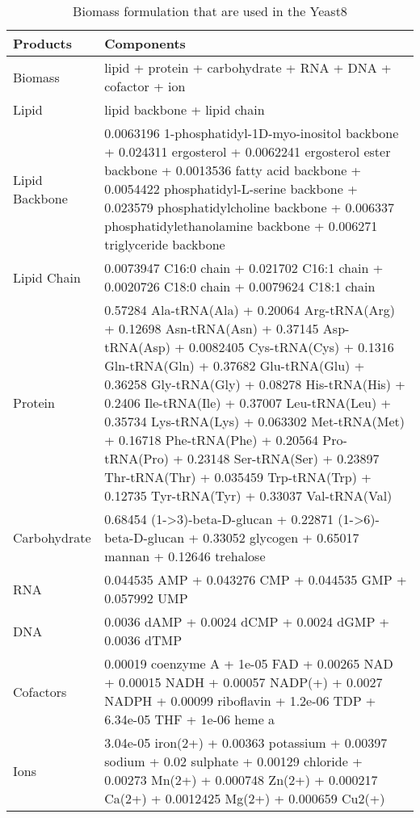 \begin{table}[H]
\small
\caption[Biomass coefficients]{Biomass formulation that are used in the Yeast8}
\begin{center}
  \begin{tabular}{|p{3cm}|p{11.5cm}|}
  \hline
  \textbf{Products} & \textbf{Components} \\ \hline
  Biomass      & lipid + protein + carbohydrate + RNA + DNA + cofactor + ion \\ \hline
    Lipid   & lipid backbone + lipid chain \\ \hline
  Lipid Backbone  & 0.0063196 1-phosphatidyl-1D-myo-inositol backbone +
  0.024311 ergosterol + 0.0062241 ergosterol ester backbone  +
  0.0013536 fatty acid backbone +
  0.0054422 phosphatidyl-L-serine backbone +
  0.023579 phosphatidylcholine backbone  +
  0.006337 phosphatidylethanolamine backbone +
  0.006271 triglyceride backbone \\ \hline
  Lipid Chain  & 0.0073947 C16:0 chain +
  0.021702 C16:1 chain +
  0.0020726 C18:0 chain +
  0.0079624 C18:1 chain \\ \hline
  Protein      & 0.57284 Ala-tRNA(Ala) +
  0.20064 Arg-tRNA(Arg) +
  0.12698 Asn-tRNA(Asn) +
  0.37145 Asp-tRNA(Asp) +
  0.0082405 Cys-tRNA(Cys) +
  0.1316 Gln-tRNA(Gln) +
  0.37682 Glu-tRNA(Glu) +
  0.36258 Gly-tRNA(Gly) +
  0.08278 His-tRNA(His) +
  0.2406 Ile-tRNA(Ile) +
  0.37007 Leu-tRNA(Leu) +
  0.35734 Lys-tRNA(Lys) +
  0.063302 Met-tRNA(Met) +
  0.16718 Phe-tRNA(Phe) +
  0.20564 Pro-tRNA(Pro) +
  0.23148 Ser-tRNA(Ser) +
  0.23897 Thr-tRNA(Thr) +
  0.035459 Trp-tRNA(Trp) +
  0.12735 Tyr-tRNA(Tyr) +
  0.33037 Val-tRNA(Val) \\ \hline
  Carbohydrate   & 0.68454 (1->3)-beta-D-glucan +
  0.22871 (1->6)-beta-D-glucan +
  0.33052 glycogen +
  0.65017 mannan +
  0.12646 trehalose \\ \hline
  RNA   & 0.044535 AMP +
  0.043276 CMP +
  0.044535 GMP +
  0.057992 UMP \\ \hline
  DNA   & 0.0036 dAMP +
  0.0024 dCMP +
  0.0024 dGMP +
  0.0036 dTMP \\ \hline
  Cofactors   & 0.00019 coenzyme A +
  1e-05 FAD +
  0.00265 NAD +
  0.00015 NADH +
  0.00057 NADP(+) +
  0.0027 NADPH +
  0.00099 riboflavin +
  1.2e-06 TDP +
  6.34e-05 THF +
  1e-06 heme a \\ \hline
  Ions   & 3.04e-05 iron(2+) +
  0.00363 potassium +
  0.00397 sodium +
  0.02 sulphate +
  0.00129 chloride +
  0.00273 Mn(2+)  +
  0.000748 Zn(2+) +
  0.000217 Ca(2+) +
  0.0012425 Mg(2+) +
  0.000659 Cu2(+) \\ \hline

  \end{tabular}
\label{table:biomass_coefficients}
\end{center}
\end{table}
